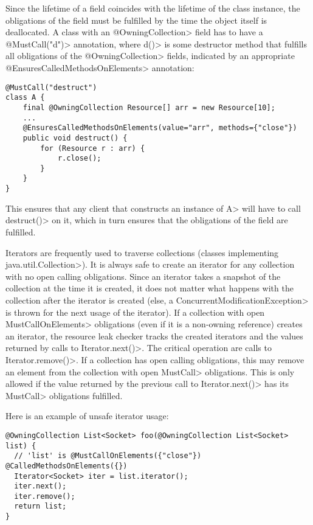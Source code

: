 Since the lifetime of a field coincides with the lifetime of the class instance, the obligations of the field must be fulfilled by the time the object itself is deallocated.
A class with an \<@OwningCollection> field has to have a \<@MustCall("d")> annotation, where \<d()> is some destructor method that fulfills all obligations of the \<@OwningCollection> fields, indicated by an appropriate \<@EnsuresCalledMethodsOnElements> annotation:

\begin{verbatim}
@MustCall("destruct")
class A {
    final @OwningCollection Resource[] arr = new Resource[10];
    ...
    @EnsuresCalledMethodsOnElements(value="arr", methods={"close"})
    public void destruct() {
        for (Resource r : arr) {
            r.close();
        }
    }
}
\end{verbatim}

This ensures that any client that constructs an instance of \<A> will have to call \<destruct()> on it, which in turn ensures that the obligations of the field are fulfilled.

Iterators are frequently used to traverse collections (classes implementing \<java.util.Collection>). It is always safe to create an iterator for any collection with no open calling obligations. Since an iterator takes a snapshot of the collection at the time it is created, it does not matter what happens with the collection after the iterator is created (else, a \<ConcurrentModificationException> is thrown for the next usage of the iterator).
If a collection with open \<MustCallOnElements> obligations (even if it is a non-owning reference) creates an iterator, the resource leak checker tracks the created iterators and the values returned by calls to \<Iterator.next()>. The critical operation are calls to \<Iterator.remove()>. If a collection has open calling obligations, this may remove an element from the collection with open \<MustCall> obligations. This is only allowed if the value returned by the previous call to \<Iterator.next()> has its \<MustCall> obligations fulfilled.

Here is an example of unsafe iterator usage:

\begin{verbatim}
@OwningCollection List<Socket> foo(@OwningCollection List<Socket> list) {
  // 'list' is @MustCallOnElements({"close"}) @CalledMethodsOnElements({})
  Iterator<Socket> iter = list.iterator();
  iter.next();
  iter.remove();
  return list;
}
\end{verbatim}

